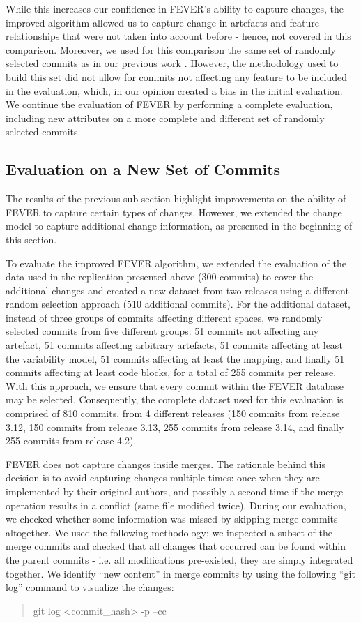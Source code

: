 While this increases our confidence in FEVER's ability to capture changes, the improved algorithm
allowed us to capture change in artefacts and feature relationships 
that were not taken into account before - hence, not covered in this comparison.
Moreover, we used for this comparison the same set of randomly selected commits as in our previous work \citep{dintzner_fever:_2016}.
However, the methodology used to build this set did not allow for commits not affecting any feature to be included
in the evaluation, which, in our opinion created a bias in the initial evaluation. 
We continue the evaluation of FEVER by performing a complete evaluation, including new attributes 
on a more complete and different set of randomly selected commits.

\subsection{Evaluation on a New Set of Commits}
\label{sec:new_eval}
The results of the previous sub-section highlight improvements on the ability of FEVER to capture certain types of changes.
However, we extended the change model to capture additional change information, as presented in 
the beginning of this section.

To evaluate the improved FEVER algorithm, we extended the evaluation of the data used in the replication 
presented above (300 commits) to cover the additional changes and created a new dataset from two releases using a different random selection approach (510 additional commits).
For the additional dataset, instead of three groups of commits affecting different spaces, 
we randomly selected commits from five different groups: 51 commits not affecting any artefact, 51 commits affecting arbitrary artefacts, 
51 commits affecting at least the variability model, 51 commits affecting at least the mapping, and finally 51 commits affecting
at least code blocks, for a total of 255 commits per release.
With this approach, we ensure that every commit within the FEVER database may be selected.
Consequently, the complete dataset used for this evaluation is comprised of 810 commits, from 4 different releases
(150 commits from release 3.12, 150 commits from release 3.13, 255 commits from release 3.14, and 
finally 255 commits from release 4.2).

FEVER does not capture changes inside merges. The rationale behind this decision is to avoid
capturing changes multiple times: once when they are implemented by their original authors, and 
possibly a second time if the merge operation results in a conflict (same file modified twice).
During our evaluation, we checked whether some information was missed by skipping merge commits altogether.
We used the following methodology: we inspected a subset of the merge commits and checked that all changes that occurred can be
found within the parent commits - i.e. all modifications pre-existed, they are simply integrated together.
We identify ``new content'' in merge commits by using the following ``git log'' command to visualize the changes: 
\begin{quote}
git log <commit\_hash> -p --cc 
\end{quote}

